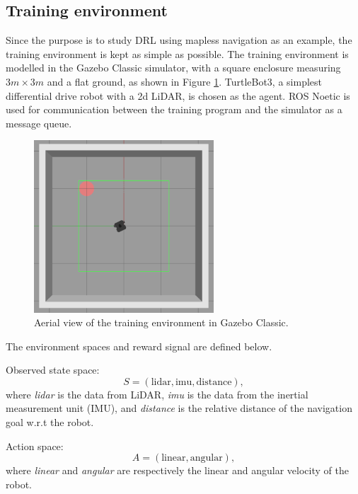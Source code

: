 \subsection{Training environment}
{
\setlength{\parindent}{0pt}
\setlength{\parskip}{1.2ex}

Since the purpose is to study DRL using mapless navigation as an example, the training environment is kept as simple as possible. The training environment is modelled in the Gazebo Classic simulator, with a square enclosure measuring $3m \times 3m$ and a flat ground, as shown in Figure \ref{fig:birdview}. TurtleBot3, a simplest differential drive robot with a 2d LiDAR, is chosen as the agent. ROS Noetic is used for communication between the training program and the simulator as a message queue.

\begin{figure}[htbp]
   \centering
   \includegraphics[width=0.6\textwidth]{images/birdview-of-env.png}
   \caption{Aerial view of the training environment in Gazebo Classic.}
   \label{fig:birdview}
\end{figure}

The environment spaces and reward signal are defined below.

Observed state space:
\begin{equation*}
    S = (\text{lidar}, \text{imu}, \text{distance}),
\end{equation*}
where \textit{lidar} is the data from LiDAR, \textit{imu} is the data from 
 the inertial measurement unit (IMU), and \textit{distance} is the relative distance of the navigation goal w.r.t the robot.

Action space:
\begin{equation*}
    A = (\text{linear}, \text{angular}),
\end{equation*}
where \textit{linear} and \textit{angular} are respectively the linear and angular velocity of the robot.

}
